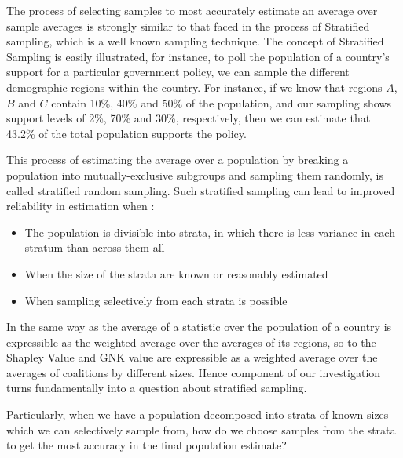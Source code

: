The process of selecting samples to most accurately estimate an average over sample averages is strongly similar to that faced in the process of Stratified sampling, which is a well known sampling technique.
The concept of Stratified Sampling is easily illustrated, for instance, to poll the population of a country's support for a particular government policy, we can sample the different demographic regions within the country.
For instance, if we know that regions $A$,$B$ and $C$ contain 10\%, 40\% and 50\% of the population, and our sampling shows support levels of 2\%, 70\% and 30\%, respectively, then we can estimate that 43.2\% of the total population supports the policy.

This process of estimating the average over a population by breaking a population into mutually-exclusive subgroups and sampling them randomly, is called stratified random sampling.
Such stratified sampling can lead to improved reliability in estimation when \cite{1938.10503378,10.2307/23339498}:
\begin{itemize}
\item The population is divisible into strata, in which there is less variance in each stratum than across them all 
\item When the size of the strata are known or reasonably estimated
\item When sampling selectively from each strata is possible 
\end{itemize}

In the same way as the average of a statistic over the population of a country is expressible as the weighted average over the averages of its regions, so to the Shapley Value and GNK value are expressible as a weighted average over the averages of coalitions by different sizes.
Hence component of our investigation turns fundamentally into a question about stratified sampling.

Particularly, when we have a population decomposed into strata of known sizes which we can selectively sample from, how do we choose samples from the strata to get the most accuracy in the final population estimate?


